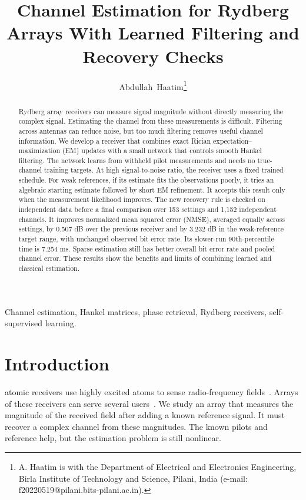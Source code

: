 \documentclass[10pt,journal,letterpaper]{IEEEtran}
\begin{document}
\title{Channel Estimation for Rydberg Arrays With Learned Filtering and Recovery Checks}
\author{Abdullah~Haatim\thanks{A. Haatim is with the Department of Electrical and Electronics Engineering, Birla Institute of Technology and Science, Pilani, India (e-mail: f20220519@pilani.bits-pilani.ac.in).}}
\maketitle
\begin{abstract}
Rydberg array receivers can measure signal magnitude without directly measuring the complex signal. Estimating the channel from these measurements is difficult. Filtering across antennas can reduce noise, but too much filtering removes useful channel information. We develop a receiver that combines exact Rician expectation--maximization (EM) updates with a small network that controls smooth Hankel filtering. The network learns from withheld pilot measurements and needs no true-channel training targets. At high signal-to-noise ratio, the receiver uses a fixed trained schedule. For weak references, if its estimate fits the observations poorly, it tries an algebraic starting estimate followed by short EM refinement. It accepts this result only when the measurement likelihood improves. The new recovery rule is checked on independent data before a final comparison over 153 settings and 1,152 independent channels. It improves normalized mean squared error (NMSE), averaged equally across settings, by 0.507 dB over the previous receiver and by 3.232 dB in the weak-reference target range, with unchanged observed bit error rate. Its slower-run 90th-percentile time is 7.254 ms. Sparse estimation still has better overall bit error rate and pooled channel error. These results show the benefits and limits of combining learned and classical estimation.
\end{abstract}
\begin{IEEEkeywords}
Channel estimation, Hankel matrices, phase retrieval, Rydberg receivers, self-supervised learning.
\end{IEEEkeywords}

\section{Introduction}
 atomic receivers use highly excited atoms to sense radio-frequency fields~\cite{gong2025mag}. Arrays of these receivers can serve several users~\cite{cui2025}. We study an array that measures the magnitude of the received field after adding a known reference signal. It must recover a complex channel from these magnitudes. The known pilots and reference help, but the estimation problem is still nonlinear.
\end{document}
